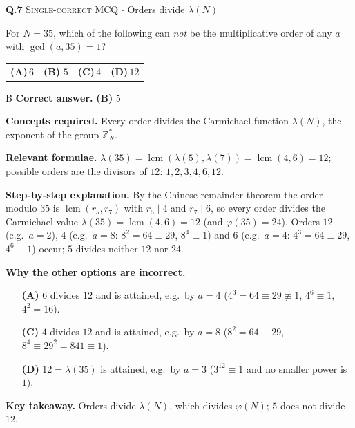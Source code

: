 \documentclass[11pt,a4paper]{article}
\newcommand{\optlabel}[1]{\textbf{(#1)}}
\newcommand{\correctlabel}[1]{\textcolor{okgreen}{\textbf{(#1)}\,\ding{51}}}
\newenvironment{qitem}[1]{\begin{list}{}{\setlength{\leftmargin}{3.3em}\setlength{\labelwidth}{3.1em}%
  \setlength{\labelsep}{0.2em}\setlength{\topsep}{3pt}\setlength{\parsep}{3pt}}\item[\textbf{Q.#1}\hfill]}{\end{list}}
\newcommand{\qsep}{\par\vspace{2pt}{\color{black!15}\hrule}\vspace{4pt}}
\newcommand{\qmeta}[2]{{\footnotesize\color{black!60}\textsc{#1} \;$\cdot$\; #2}\par}
\begin{document}
\begin{qitem}{7}
\qmeta{Single-correct MCQ}{Orders divide $\lambda(N)$}
For $N = 35$, which of the following can \emph{not} be the multiplicative order of any $a$ with $\gcd(a, 35) = 1$?
\par\smallskip\noindent\begin{tabularx}{\linewidth}{@{}*{4}{L}@{}}
\optlabel{A}\,$6$ & \correctlabel{B}\,$5$ & \optlabel{C}\,$4$ & \optlabel{D}\,$12$
\end{tabularx}
\end{qitem}
\begin{solbox}{B}
\textbf{\color{brand}Correct answer.} \textcolor{okgreen}{\textbf{(B)}} $5$

\textbf{\color{brand}Concepts required.} Every order divides the Carmichael function $\lambda(N)$, the exponent of the group $\mathbb Z_N^*$.

\textbf{\color{brand}Relevant formulae.} $\lambda(35) = \operatorname{lcm}(\lambda(5), \lambda(7)) = \operatorname{lcm}(4, 6) = 12$; possible orders are the divisors of $12$: $1, 2, 3, 4, 6, 12$.

\textbf{\color{brand}Step-by-step explanation.} By the Chinese remainder theorem the order modulo $35$ is $\operatorname{lcm}(r_5, r_7)$ with $r_5 \mid 4$ and $r_7 \mid 6$, so every order divides the
Carmichael value $\lambda(35) = \operatorname{lcm}(4, 6) = 12$ (and $\varphi(35) = 24$). Orders $12$ (e.g.\ $a = 2$), $4$ (e.g.\ $a = 8$: $8^2 = 64 \equiv 29$,
$8^4 \equiv 1$) and $6$ (e.g.\ $a = 4$: $4^3 = 64 \equiv 29$, $4^6 \equiv 1$) occur; $5$ divides neither $12$ nor $24$.

\textbf{\color{brand}Why the other options are incorrect.}
\begin{itemize}[leftmargin=2.4em, itemsep=1pt, topsep=2pt]
\item[\textbf{(A)}] $6$ divides $12$ and is attained, e.g.\ by $a = 4$ ($4^3 = 64 \equiv 29 \not\equiv 1$, $4^6 \equiv 1$, $4^2 = 16$).
\item[\textbf{(C)}] $4$ divides $12$ and is attained, e.g.\ by $a = 8$ ($8^2 = 64 \equiv 29$, $8^4 \equiv 29^2 = 841 \equiv 1$).
\item[\textbf{(D)}] $12 = \lambda(35)$ is attained, e.g.\ by $a = 3$ ($3^{12} \equiv 1$ and no smaller power is $1$).
\end{itemize}
\textbf{\color{brand}Key takeaway.} Orders divide $\lambda(N)$, which divides $\varphi(N)$; $5$ does not divide $12$.
\end{solbox}
\qsep
\end{document}
